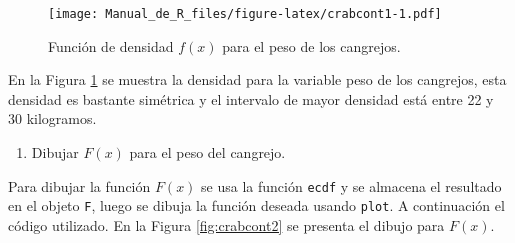 \documentclass[10pt,]{krantz}
\makeatletter
\newenvironment{Shaded}{\begin{snugshade}}{\end{snugshade}}
\newcommand{\KeywordTok}[1]{\textcolor[rgb]{0.13,0.29,0.53}{\textbf{{#1}}}}
\newcommand{\DataTypeTok}[1]{\textcolor[rgb]{0.13,0.29,0.53}{{#1}}}
\newcommand{\DecValTok}[1]{\textcolor[rgb]{0.00,0.00,0.81}{{#1}}}
\newcommand{\FloatTok}[1]{\textcolor[rgb]{0.00,0.00,0.81}{{#1}}}
\newcommand{\StringTok}[1]{\textcolor[rgb]{0.31,0.60,0.02}{{#1}}}
\newcommand{\NormalTok}[1]{{#1}}
\providecommand{\tightlist}{%
  \setlength{\itemsep}{0pt}\setlength{\parskip}{0pt}}
\newenvironment{kframe}{%
\medskip{}
\setlength{\fboxsep}{.8em}
 \def\at@end@of@kframe{}%
 \ifinner\ifhmode%
  \def\at@end@of@kframe{\end{minipage}}%
  \begin{minipage}{\columnwidth}%
 \fi\fi%
 \def\FrameCommand##1{\hskip\@totalleftmargin \hskip-\fboxsep
 \colorbox{shadecolor}{##1}\hskip-\fboxsep
     \hskip-\linewidth \hskip-\@totalleftmargin \hskip\columnwidth}%
 \MakeFramed {\advance\hsize-\width
   \@totalleftmargin\z@ \linewidth\hsize
   \@setminipage}}%
 {\par\unskip\endMakeFramed%
 \at@end@of@kframe}
\renewenvironment{Shaded}{\begin{kframe}}{\end{kframe}}
\makeatother
\begin{document}
\begin{Shaded}
\end{Shaded}

\begin{figure}[htbp]
\centering
\texttt{[image: Manual\_de\_R\_files/figure-latex/crabcont1-1.pdf]}
\caption{\label{fig:crabcont1}Función de densidad \(f(x)\) para el peso de
los cangrejos.}
\end{figure}

En la Figura \ref{fig:crabcont1} se muestra la densidad para la variable
peso de los cangrejos, esta densidad es bastante simétrica y el
intervalo de mayor densidad está entre 22 y 30 kilogramos.

\begin{enumerate}
\def\labelenumi{\arabic{enumi})}
\setcounter{enumi}{1}
\tightlist
\item
  Dibujar \(F(x)\) para el peso del cangrejo.
\end{enumerate}

Para dibujar la función \(F(x)\) se usa la función \texttt{ecdf} y se
almacena el resultado en el objeto \texttt{F}, luego se dibuja la
función deseada usando \texttt{plot}. A continuación el código
utilizado. En la Figura \ref{fig:crabcont2} se presenta el dibujo para
\(F(x)\).

\begin{Shaded}
\end{Shaded}
\end{document}
